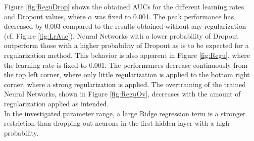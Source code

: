 Figure \ref{fig:ReguDrop} shows the obtained AUCs for the different learning rates and Dropout values, where $\alpha$ was fixed to 0.001. The peak performance has decreased by 0.003 compared to the results obtained without any regularization (cf. Figure \ref{fig:LrAuc}). Neural Networks with a lower probability of Dropout outperform those with a higher probability of Dropout as is to be expected for a regularization method. This behavior is also apparent in Figure \ref{fig:Regu}, where the learning rate is fixed to 0.001. The performances decrease continuously from the top left corner, where only little regularization is applied to the bottom right corner, where a strong regularization is applied. The overtraining of the trained Neural Networks, shown in Figure \ref{fig:ReguOv}, decreases with the amount of regularization applied as intended. \\
In the investigated parameter range, a large Ridge regression term is a stronger restriction than dropping out neurons in the first hidden layer with a high probability.

